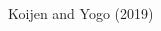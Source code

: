 \documentclass[notes,11pt, aspectratio=169]{beamer}
\begin{document}
\begin{frame}{Koijen and Yogo (2019)}
\begin{columns}[T]
\begin{column}{.5\textwidth}
  \end{column}
\end{columns}

\end{frame}
\end{document}
